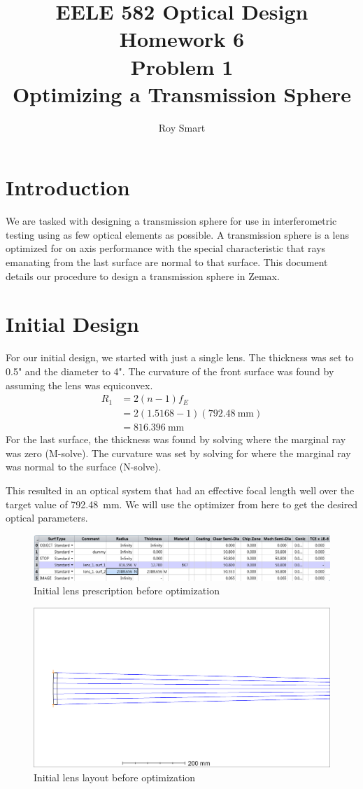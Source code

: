 \documentclass[10pt]{article}
\title{EELE 582 Optical Design \\ Homework 6 \\ Problem 1 \\ Optimizing a Transmission Sphere }
\author{Roy Smart}
\begin{document}
	
\maketitle	

\section{Introduction}

We are tasked with designing a transmission sphere for use in interferometric testing using as few optical elements as possible. A transmission sphere is a lens optimized for on axis performance with the special characteristic that rays emanating from the last surface are normal to that surface. This document details our procedure to design a transmission sphere in Zemax.

\section{Initial Design}

For our initial design, we started with just a single lens. The thickness was set to 0.5" and the diameter to 4". The curvature of the front surface was found by assuming the lens was equiconvex.
\begin{align*}
	R_1 &=2 (n - 1) f_E \\
	&= 2 (1.5168 - 1) (\SI{792.48}{\milli\meter}) \\
	&= \SI{816.396}{\milli\meter}
\end{align*}
For the last surface, the thickness was found by solving where the marginal ray was zero (M-solve). The curvature was set by solving for where the marginal ray was normal to the surface (N-solve).

This resulted in an optical system that had an effective focal length well over the target value of \SI{792.48}{\milli\meter}. We will use the optimizer from here to get the desired optical parameters.

\begin{figure}[h!]
	\centering
	\includegraphics[width=0.75\linewidth]{../zemax/1_oneElement/1_initial/lens.PNG}
	\caption{Initial lens prescription before optimization}
\end{figure}
\begin{figure}[h!]
	\centering
	\includegraphics[width=0.75\linewidth]{../zemax/1_oneElement/1_initial/layout.png}
	\caption{Initial lens layout before optimization}
\end{figure}
\end{document}

